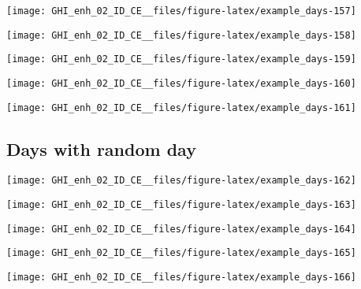\documentclass[
  10pt,
  a4paper,oneside]{article}
\begin{document}
\begin{center}\texttt{[image: GHI\_enh\_02\_ID\_CE\_\_files/figure-latex/example\_days-157]} \end{center}

\begin{center}\texttt{[image: GHI\_enh\_02\_ID\_CE\_\_files/figure-latex/example\_days-158]} \end{center}

\begin{center}\texttt{[image: GHI\_enh\_02\_ID\_CE\_\_files/figure-latex/example\_days-159]} \end{center}

\begin{center}\texttt{[image: GHI\_enh\_02\_ID\_CE\_\_files/figure-latex/example\_days-160]} \end{center}

\begin{center}\texttt{[image: GHI\_enh\_02\_ID\_CE\_\_files/figure-latex/example\_days-161]} \end{center}

\FloatBarrier

\hypertarget{days-with-random-day}{%
\subsection{Days with random day}\label{days-with-random-day}}

\begin{center}\texttt{[image: GHI\_enh\_02\_ID\_CE\_\_files/figure-latex/example\_days-162]} \end{center}

\begin{center}\texttt{[image: GHI\_enh\_02\_ID\_CE\_\_files/figure-latex/example\_days-163]} \end{center}

\begin{center}\texttt{[image: GHI\_enh\_02\_ID\_CE\_\_files/figure-latex/example\_days-164]} \end{center}

\begin{center}\texttt{[image: GHI\_enh\_02\_ID\_CE\_\_files/figure-latex/example\_days-165]} \end{center}

\begin{center}\texttt{[image: GHI\_enh\_02\_ID\_CE\_\_files/figure-latex/example\_days-166]} \end{center}
\end{document}
